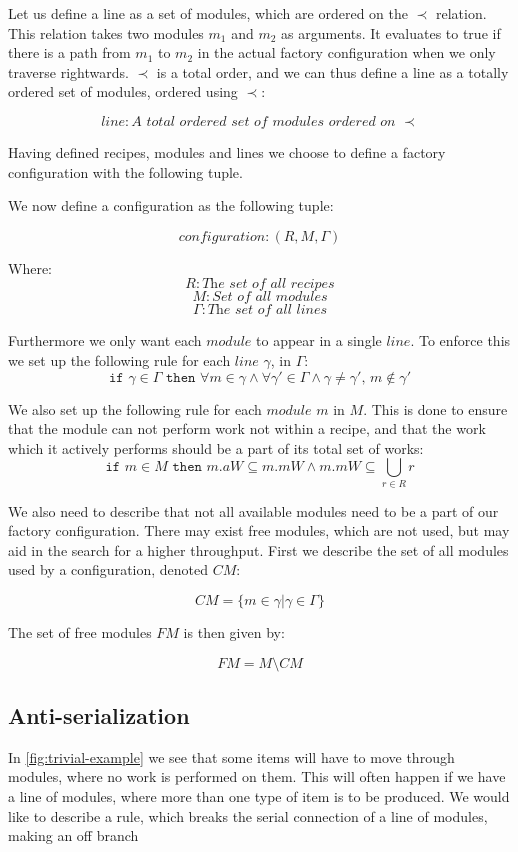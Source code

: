 Let us define a line as a set of modules, which are ordered on the $\prec$ relation. This relation takes two modules $m_1$ and $m_2$ as arguments. It evaluates to true if there is a path from $m_1$ to $m_2$ in the actual factory configuration when we only traverse rightwards. $\prec$ is a total order, and we can thus define a line as a totally ordered set of modules, ordered using $\prec$:

\[line: \textit{A total ordered set of modules ordered on } \prec\]

Having defined recipes, modules and lines we choose to define a factory configuration with the following tuple. 

We now define a configuration as the following tuple:

\[configuration: (R, M, \Gamma)\]

Where:
\[R: \textit{The set of all recipes}\]
\[M: \textit{Set of all modules}\]
\[\Gamma: \textit{The set of all lines}\]


Furthermore we only want each $module$ to appear in a single $line$. To enforce this we set up the following rule for each $line$ $\gamma$, in $\Gamma$:
\[\texttt{if } \gamma \in \Gamma \texttt{ then } \forall m \in \gamma \land \forall \gamma ' \in \Gamma \land \gamma \neq \gamma ',\, m \notin \gamma ' \]


We also set up the following rule for each $module$ $m$ in $M$. This is done to ensure that the module can not perform work not within a recipe, and that the work which it actively performs should be a part of its total set of works:
\[\texttt{if } m \in M \texttt{ then } m.aW \subseteq m.mW \land m.mW \subseteq  \bigcup_{r\in R}r\] 

We also need to describe that not all available modules need to be a part of our factory configuration. There may exist free modules, which are not used, but may aid in the search for a higher throughput. First we describe the set of all modules used by a configuration, denoted $CM$:

\[CM = \{m \in \gamma | \gamma \in \Gamma \}\]

The set of free modules $FM$ is then given by:

\[FM = M \setminus CM \]


\subsection{Anti-serialization}
In \cref{fig:trivial-example} we see that some items will have to move through modules, where no work is performed on them. This will often happen if we have a line of modules, where more than one type of item is to be produced. We would like to describe a rule, which breaks the serial connection of a line of modules, making an off branch 


